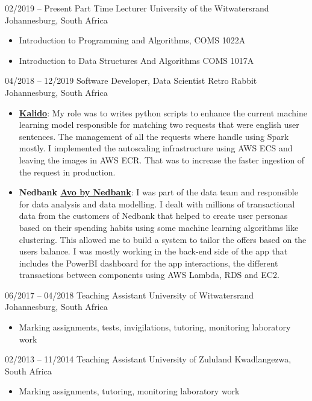 \documentclass[letterpaper]{moderncv}        %
\begin{document}
\cventry
{02/2019 -- Present}
{Part Time Lecturer}
{University of the Witwatersrand}
{Johannesburg, South Africa}
{}
{\begin{itemize}%
		\item Introduction to Programming and Algorithms, COMS 1022A
		\item Introduction to Data Structures And Algorithms COMS 1017A
\end{itemize}}

\cventry
{04/2018 -- 12/2019}
{Software Developer, Data Scientist}
{Retro Rabbit}
{Johannesburg, South Africa}
{}
{\begin{itemize}%
		\item \textbf{\href{https://www.kalido.me/}{Kalido}}: My role was to writes python scripts to enhance the current machine learning model responsible for matching two requests that were english user sentences. The management of all the requests where handle using Spark mostly. I implemented the autoscaling infrastructure using AWS ECS and leaving the images in AWS ECR. That was to increase the faster ingestion of the request in production. 
		\item \textbf{Nedbank \href{https://www.nedbank.co.za/content/nedbank/desktop/gt/en/personal/nedbank-money/avo.html}{Avo by Nedbank}}: I was part of the data team and responsible for data analysis and data modelling. I dealt with millions of transactional data from the customers of Nedbank that helped to create user personas based on their spending habits using some machine learning algorithms like clustering. This allowed me to build a system to tailor the offers based on the users balance. I was mostly working in the back-end side of the app that includes the PowerBI dashboard for the app interactions, the different transactions between components using AWS Lambda, RDS and EC2.
\end{itemize}}

\cventry
{06/2017 -- 04/2018}
{Teaching Assistant}
{University of Witwatersrand}
{Johannesburg, South Africa}
{}
{\begin{itemize}%
	\item Marking assignments, tests, invigilations, tutoring, monitoring laboratory work
	\end{itemize}}
\cventry
{02/2013 -- 11/2014}
{Teaching Assistant}
{University of Zululand}
{Kwadlangezwa, South Africa}
{}
{\begin{itemize}%
	\item Marking assignments, tutoring, monitoring laboratory work
	\end{itemize}}
\end{document}
